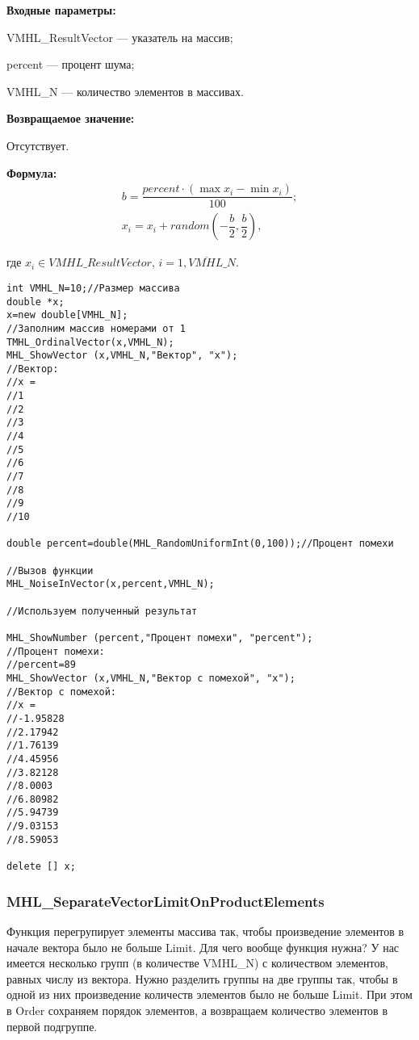 \documentclass[a4paper,12pt]{article}
\begin{document}
\textbf{Входные параметры:}  

 VMHL\_ResultVector --- указатель на массив;
 
 percent --- процент шума;
 
 VMHL\_N --- количество элементов в массивах.

\textbf{Возвращаемое значение:}

Отсутствует.

\textbf{Формула:}
\begin{eqnarray*}
b=\dfrac{percent\cdot\left( \max{x_i}-\min{x_i}\right)}{100};\\
x_i=x_i+random \left( -\dfrac{b}{2},\dfrac{b}{2}\right),
\end{eqnarray*}

где $x_i \in VMHL\_ResultVector$, $i=\overline{1,VMHL\_N}$.


\begin{lstlisting}[label=code_use_MHL_NoiseInVector,caption=Пример использования]
int VMHL_N=10;//Размер массива
double *x;
x=new double[VMHL_N];
//Заполним массив номерами от 1
TMHL_OrdinalVector(x,VMHL_N);
MHL_ShowVector (x,VMHL_N,"Вектор", "x");
//Вектор:
//x =
//1
//2
//3
//4
//5
//6
//7
//8
//9
//10

double percent=double(MHL_RandomUniformInt(0,100));//Процент помехи

//Вызов функции
MHL_NoiseInVector(x,percent,VMHL_N);

//Используем полученный результат

MHL_ShowNumber (percent,"Процент помехи", "percent");
//Процент помехи:
//percent=89
MHL_ShowVector (x,VMHL_N,"Вектор с помехой", "x");
//Вектор с помехой:
//x =
//-1.95828
//2.17942
//1.76139
//4.45956
//3.82128
//8.0003
//6.80982
//5.94739
//9.03153
//8.59053

delete [] x;
\end{lstlisting}

\subsubsection{MHL\_SeparateVectorLimitOnProductElements}\label{MHL_SeparateVectorLimitOnProductElements}

Функция перегрупирует элементы массива так, чтобы произведение элементов в начале вектора было не больше Limit. Для чего вообще функция нужна? У нас имеется несколько групп (в количестве VMHL\_N) с количеством элементов, равных числу из вектора. Нужно разделить группы на две группы так, чтобы в одной из них произведение количеств элементов было не больше Limit. При этом в Order сохраняем порядок элементов, а возвращаем количество элементов в первой подгруппе.
\end{document}
